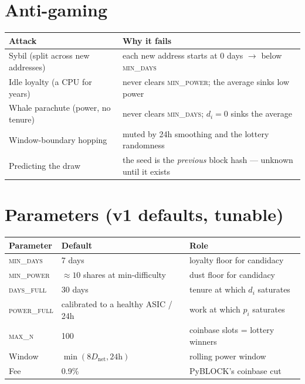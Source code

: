 \documentclass[11pt]{article}
\begin{document}
\section{Anti-gaming}
\begin{center}
\begin{tabular}{@{}ll@{}}
\toprule
\textbf{Attack} & \textbf{Why it fails} \\
\midrule
Sybil (split across new addresses) & each new address starts at 0 days $\rightarrow$ below \textsc{min\_days} \\
Idle loyalty (a CPU for years) & never clears \textsc{min\_power}; the average sinks low power \\
Whale parachute (power, no tenure) & never clears \textsc{min\_days}; $d_i = 0$ sinks the average \\
Window-boundary hopping & muted by 24h smoothing and the lottery randomness \\
Predicting the draw & the seed is the \emph{previous} block hash --- unknown until it exists \\
\bottomrule
\end{tabular}
\end{center}

\section{Parameters (v1 defaults, tunable)}
\begin{center}
\begin{tabular}{@{}lll@{}}
\toprule
\textbf{Parameter} & \textbf{Default} & \textbf{Role} \\
\midrule
\textsc{min\_days}   & 7 days & loyalty floor for candidacy \\
\textsc{min\_power}  & $\approx 10$ shares at min-difficulty & dust floor for candidacy \\
\textsc{days\_full}  & 30 days & tenure at which $d_i$ saturates \\
\textsc{power\_full} & calibrated to a healthy ASIC / 24h & work at which $p_i$ saturates \\
\textsc{max\_n}      & 100 & coinbase slots = lottery winners \\
Window               & $\min(8 D_{\text{net}}, 24\text{h})$ & rolling power window \\
Fee                  & 0.9\% & PyBLOCK's coinbase cut \\
\bottomrule
\end{tabular}
\end{center}
\end{document}
